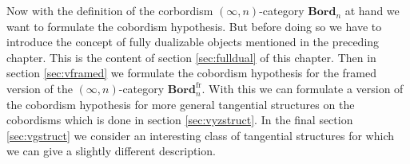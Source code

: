 Now with the definition of the corbordism $(\infty,n)$-category $\mathbf{Bord}_{n}$ at hand we want to formulate the cobordism hypothesis. But before doing so we have to introduce the concept of fully dualizable objects mentioned in the preceding chapter. This is the content of section \ref{sec:fulldual} of this chapter. Then in section \ref{sec:vframed} we formulate the cobordism hypothesis for the framed version of the $(\infty,n)$-category $\mathbf{Bord}_{n}^{\mathrm{fr}}$. With this we can formulate a version of the cobordism hypothesis for more general tangential structures on the cobordisms which is done in section \ref{sec:vyzstruct}. In the final section \ref{sec:vgstruct} we consider an interesting class of tangential structures for which we can give a slightly different description.
